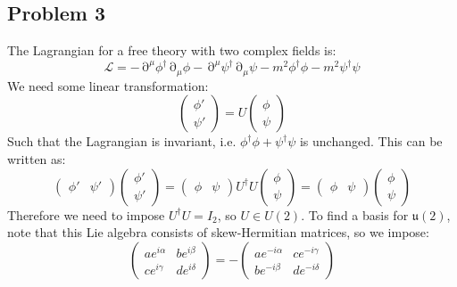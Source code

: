 \documentclass[12 pt]{article}
\DeclareMathOperator {\p} {\partial}
\begin{document}
\subsection*{Problem 3}
The Lagrangian for a free theory with two complex fields is:
\[      \mathcal{L} = - \p^{\mu} \phi^{\dagger} \p_{\mu} \phi -  \p^{\mu} \psi^{\dagger} \p_{\mu} \psi - m^2 \phi^{\dagger} \phi - m^2 \psi^{\dagger} \psi  \]
We need some linear transformation:
\[        \left( \begin{array} {c} \phi ' \\ \psi' \end{array} \right) =  U  \left( \begin{array} {c} \phi  \\ \psi \end{array} \right)    \]
Such that the Lagrangian is invariant, i.e. $\phi^{\dagger} \phi + \psi^{\dagger} \psi$ is unchanged. This can be written as:
\[          \left( \begin{array} {cc} \phi ' & \psi' \end{array} \right)  \left( \begin{array} {c} \phi ' \\ \psi' \end{array} \right)   =   \left( \begin{array} {cc} \phi  & \psi \end{array} \right) U^{\dagger} U \left( \begin{array} {c} \phi  \\ \psi \end{array} \right) = \left( \begin{array} {cc} \phi  & \psi \end{array} \right)  \left( \begin{array} {c} \phi  \\ \psi \end{array} \right)     \]
Therefore we need  to impose $U^{\dagger} U = I_2$, so $U\in U(2)$. To find a basis for $\mathfrak{u}(2)$, note that this Lie algebra consists of skew-Hermitian matrices, so we impose:
\[     \left( \begin{array} {cc}  a e^{i\alpha} & b e^{i \beta} \\ c e^{i\gamma} & d e^{i\delta}  \end{array}   \right)   = -  \left( \begin{array} {cc}  a e^{-i\alpha} & c e^{-i\gamma}  \\ b e^{-i \beta} & d e^{-i\delta}  \end{array}   \right)   \]
\end{document}
